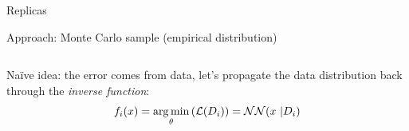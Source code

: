 \documentclass[9pt]{beamer}
\begin{document}
\begin{frame}{Replicas}
    \begin{center}
        \nnpdf{} Approach: Monte Carlo sample (empirical distribution)
    \end{center}
    \vspace*{20pt}

    \begin{columns}
        \begin{column}{0.4\textwidth}
            \vspace*{10pt}
            Na\"ive idea: the error comes from data, let's propagate the data
            distribution back through the \textit{inverse function}:
            \begin{equation*}
                f_i(x) =
                \operatorname*{arg\,min}_\theta\left(\mathcal{L}(D_i)\right) = \mathcal{NN}(x\ | D_i)
            \end{equation*}
            \vspace*{10pt}


\end{column}
\end{columns}
\end{frame}
\end{document}
